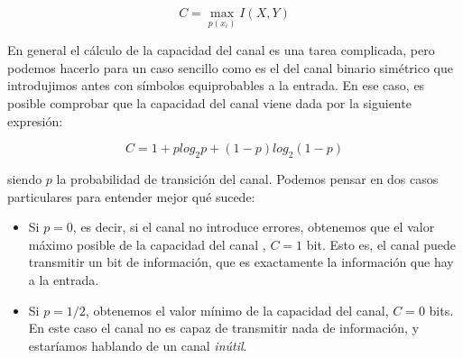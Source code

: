 \documentclass[es,apuntes]{uah}
\begin{document}
\begin{displaymath}
	C = \max_{p(x_i)} I(X,Y)
\end{displaymath}

En general el cálculo de la capacidad del canal es una tarea complicada, pero podemos hacerlo para un caso sencillo como es el del canal binario simétrico que introdujimos antes con símbolos equiprobables a la entrada. En ese caso, es posible comprobar que la capacidad del canal viene dada por la siguiente expresión:

\begin{displaymath}
C = 1 + p log_2 p + (1-p)log_2(1-p) 
\end{displaymath}

siendo $p$ la probabilidad de transición del canal. Podemos pensar en dos casos particulares para entender mejor qué sucede:

\begin{itemize}
\item Si $p=0$, es decir, si el canal no introduce errores, obtenemos que el valor máximo posible de la capacidad del canal , $C=1$ bit. Esto es, el canal puede transmitir un bit de información, que es exactamente la información que hay a la entrada. 
\item Si $p=1/2$, obtenemos el valor mínimo de la capacidad del canal, $C=0$ bits. En este caso el canal no es capaz de transmitir nada de información, y estaríamos hablando de un canal \emph{inútil}. 
\end{itemize}



\end{document}
